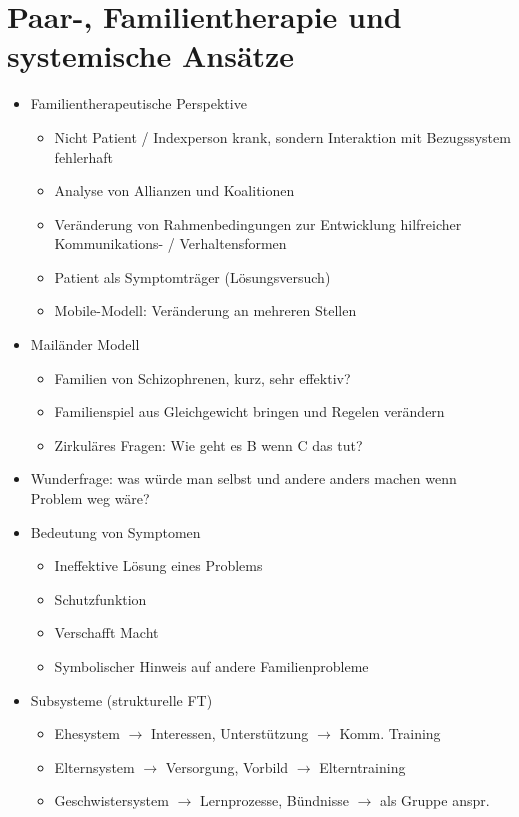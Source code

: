 \documentclass[11pt, paper=a4, twocolumn]{scrartcl}
\begin{document}
	\section{Paar-, Familientherapie und systemische Ansätze}
		\begin{itemize}
			\item Familientherapeutische Perspektive
				\begin{itemize}
					\item Nicht Patient / Indexperson krank, sondern Interaktion mit Bezugssystem fehlerhaft
					\item Analyse von Allianzen und Koalitionen
					\item Veränderung von Rahmenbedingungen zur Entwicklung hilfreicher Kommunikations- / 
						Verhaltensformen
					\item Patient als Symptomträger (Lösungsversuch)
					\item Mobile-Modell: Veränderung an mehreren Stellen
				\end{itemize}
			\item Mailänder Modell
				\begin{itemize}
					\item Familien von Schizophrenen, kurz, sehr effektiv?
					\item Familienspiel aus Gleichgewicht bringen und Regelen verändern
					\item Zirkuläres Fragen: Wie geht es B wenn C das tut?
				\end{itemize}
			\item Wunderfrage: was würde man selbst und andere anders machen wenn Problem weg wäre?
			\item Bedeutung von Symptomen
				\begin{itemize}
					\item Ineffektive Lösung eines Problems
					\item Schutzfunktion
					\item Verschafft Macht
					\item Symbolischer Hinweis auf andere Familienprobleme
				\end{itemize}
			\item Subsysteme (strukturelle FT)
				\begin{itemize}
					\item Ehesystem $\rightarrow$ Interessen, Unterstützung $\rightarrow$ Komm. Training
					\item Elternsystem $\rightarrow$ Versorgung, Vorbild $\rightarrow$ Elterntraining
					\item Geschwistersystem $\rightarrow$ Lernprozesse, Bündnisse $\rightarrow$ als Gruppe anspr.

\end{itemize}
\end{itemize}
\end{document}

